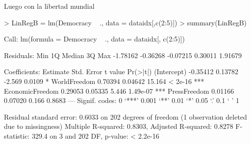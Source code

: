 \documentclass{article}
\begin{document}
Luego con la libertad mundial

\begin{Schunk}
\begin{Sinput}
> LinRegB = lm(Democracy ~ ., data = dataidx[,c(2:5)])
> summary(LinRegB)
\end{Sinput}
\begin{Soutput}
Call:
lm(formula = Democracy ~ ., data = dataidx[, c(2:5)])

Residuals:
     Min       1Q   Median       3Q      Max 
-1.78162 -0.36268 -0.07215  0.30011  1.91679 

Coefficients:
                Estimate Std. Error t value Pr(>|t|)    
(Intercept)     -0.35412    0.13782  -2.569   0.0109 *  
WorldFreedom     0.70394    0.04642  15.164  < 2e-16 ***
EconomicFreedom  0.29053    0.05335   5.446 1.49e-07 ***
PressFreedom     0.01166    0.07020   0.166   0.8683    
---
Signif. codes:  0 ‘***’ 0.001 ‘**’ 0.01 ‘*’ 0.05 ‘.’ 0.1 ‘ ’ 1

Residual standard error: 0.6033 on 202 degrees of freedom
  (1 observation deleted due to missingness)
Multiple R-squared:  0.8303,	Adjusted R-squared:  0.8278 
F-statistic: 329.4 on 3 and 202 DF,  p-value: < 2.2e-16
\end{Soutput}
\end{Schunk}



% 






% 
% 




% 
% 
% 
\end{document}
